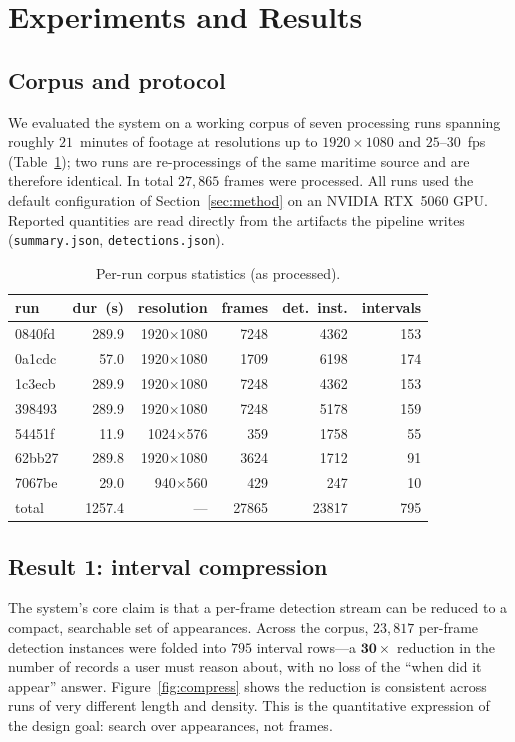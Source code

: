 \documentclass[conference]{IEEEtran}
\begin{document}
\section{Experiments and Results}
\label{sec:experiments}
\subsection{Corpus and protocol}
We evaluated the system on a working corpus of seven processing runs
spanning roughly $21$~minutes of footage at resolutions up to
$1920\times1080$ and $25$--$30$~fps (Table~\ref{tab:corpus}); two runs
are re-processings of the same maritime source and are therefore
identical. In total $27{,}865$ frames were processed. All runs used the
default configuration of Section~\ref{sec:method} on an NVIDIA RTX~5060
GPU. Reported quantities are read directly from the artifacts the
pipeline writes (\texttt{summary.json}, \texttt{detections.json}).

\begin{table}[t]
\caption{Per-run corpus statistics (as processed).}
\label{tab:corpus}
\centering
\footnotesize
\setlength{\tabcolsep}{3.2pt}
\begin{tabular}{lrrrrr}
\toprule
run & dur~(s) & resolution & frames & det.\ inst. & intervals \\
\midrule
0840fd & 289.9 & 1920$\times$1080 & 7248 & 4362 & 153 \\
0a1cdc & 57.0  & 1920$\times$1080 & 1709 & 6198 & 174 \\
1c3ecb & 289.9 & 1920$\times$1080 & 7248 & 4362 & 153 \\
398493 & 289.9 & 1920$\times$1080 & 7248 & 5178 & 159 \\
54451f & 11.9  & 1024$\times$576  & 359  & 1758 & 55  \\
62bb27 & 289.8 & 1920$\times$1080 & 3624 & 1712 & 91  \\
7067be & 29.0  & 940$\times$560   & 429  & 247  & 10  \\
\midrule
total & 1257.4 & --- & 27865 & 23817 & 795 \\
\bottomrule
\end{tabular}
\end{table}

\subsection{Result 1: interval compression}
The system's core claim is that a per-frame detection stream can be
reduced to a compact, searchable set of appearances. Across the corpus,
$23{,}817$ per-frame detection instances were folded into $795$ interval
rows---a $\mathbf{30\times}$ reduction in the number of records a user
must reason about, with no loss of the ``when did it appear'' answer.
Figure~\ref{fig:compress} shows the reduction is consistent across runs
of very different length and density. This is the quantitative
expression of the design goal: search over appearances, not frames.
\end{document}
